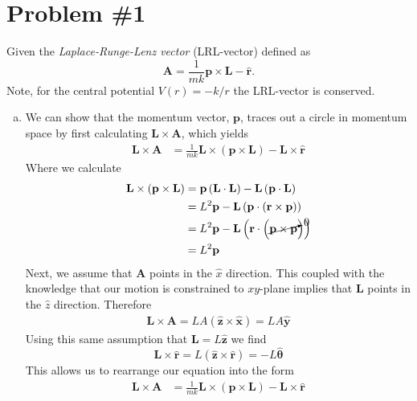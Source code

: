 \documentclass[11pt]{article}
\numberwithin{equation}{section}
\begin{document}


\section{Problem \#1}
Given the \emph{Laplace-Runge-Lenz vector} (LRL-vector) defined as
\begin{equation}
\mathbf{A} = \frac{1}{mk}\mathbf{p}\times\mathbf{L}-\mathbf{\hat{r}}.
\label{LRLVector}
\end{equation}
Note, for the central potential $V(r) = -k/r$ the LRL-vector is conserved.

\begin{enumerate}[(a)]
\item We can show that the momentum vector, $\mathbf{p}$, traces out a circle in momentum 
space by first calculating $\mathbf{L}\times\mathbf{A}$, which yields
\begin{align*}
\mathbf{L}\times\mathbf{A} &= \frac{1}{mk}\mathbf{L}\times\left(\mathbf{p}\times\mathbf{L}\right) - \mathbf{L}\times\mathbf{\hat{r}}
\end{align*}
Where we calculate
\begin{align*}
\mathbf{L}\times\left(\mathbf{p}\times\mathbf{L}\right) &= \mathbf{p}\left(\mathbf{L}\cdot\mathbf{L}\right) - \mathbf{L}\left(\mathbf{p}\cdot\mathbf{L}\right)\\
&= L^2\mathbf{p} - \mathbf{L}\left(\mathbf{p}\cdot\left(\mathbf{r}\times\mathbf{p}\right)\right)\\
&= L^2\mathbf{p} - \mathbf{L}\left(\mathbf{r}\cdot\left(\cancelto{0}{\mathbf{p}\times\mathbf{p}}\right)\right)\\
&= L^2\mathbf{p}
\end{align*}
Next, we assume that $\mathbf{A}$ points in the $\hat{x}$ direction. This coupled with the
knowledge that our motion is constrained to $xy$-plane implies that $\mathbf{L}$ points in 
the $\hat{z}$ direction. Therefore
\begin{align*}
\mathbf{L}\times\mathbf{A} = LA(\mathbf{\hat{z}}\times\mathbf{\hat{x}}) = LA\mathbf{\hat{y}}
\end{align*}
Using this same assumption that $\mathbf{L} = L\mathbf{\hat{z}}$ we find
$$\mathbf{L}\times\mathbf{\hat{r}} = L(\mathbf{\hat{z}}\times\mathbf{\hat{r}}) = -L\mathbf{\hat{\theta}}$$
This allows us to rearrange our equation into the form
\begin{align*}
\mathbf{L}\times\mathbf{A} &= \frac{1}{mk}\mathbf{L}\times\left(\mathbf{p}\times\mathbf{L}\right) - \mathbf{L}\times\mathbf{\hat{r}}\\

\end{align*}
\end{enumerate}
\end{document}
